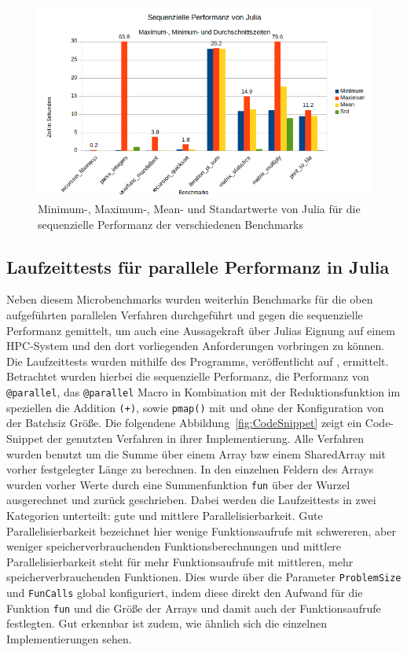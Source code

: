 \documentclass[proseminar,german,utf8]{zihpub}
\begin{document}
\begin{figure}[hbt!]
  \centering
  \includegraphics[scale=0.8]{bilder/julia_performance.png}
  \caption{Minimum-, Maximum-, Mean- und Standartwerte von Julia für die sequenzielle Performanz der verschiedenen Benchmarks }
  \label{fig:juliaPerform}
\end{figure}


\subsection{Laufzeittests für parallele Performanz in Julia}

Neben diesem Microbenchmarks wurden weiterhin Benchmarks für die oben aufgeführten parallelen Verfahren durchgeführt und gegen die sequenzielle Performanz gemittelt, um auch eine Aussagekraft über Julias Eignung auf einem HPC-System und den dort vorliegenden Anforderungen vorbringen zu können. Die Laufzeittests wurden mithilfe des Programms, veröffentlicht auf \cite{JuliaCookbook}, ermittelt. Betrachtet wurden hierbei die sequenzielle Performanz, die Performanz von \verb|@parallel|, das \verb|@parallel| Macro in Kombination mit der Reduktionsfunktion im speziellen die Addition \verb|(+)|, sowie \verb|pmap()| mit und ohne der Konfiguration von der Batchsiz  Größe. Die folgendene Abbildung~\ref{fig:CodeSnippet} zeigt ein Code-Snippet der genutzten Verfahren in ihrer Implementierung. Alle Verfahren wurden benutzt um die Summe über einem Array bzw einem SharedArray mit vorher festgelegter Länge zu berechnen. In den einzelnen Feldern des Arrays wurden vorher Werte durch eine Summenfunktion \verb|fun| über der Wurzel ausgerechnet und zurück geschrieben. Dabei werden die Laufzeittests in zwei Kategorien unterteilt: gute und mittlere Parallelisierbarkeit. Gute Parallelisierbarkeit bezeichnet hier wenige Funktionsaufrufe mit schwereren, aber weniger speicherverbrauchenden Funktionsberechnungen und mittlere Parallelisierbarkeit steht für mehr Funktionsaufrufe mit mittleren, mehr speicherverbrauchenden Funktionen. Dies wurde über die Parameter \verb|ProblemSize| und \verb|FunCalls| global konfiguriert, indem diese direkt den Aufwand für die Funktion \verb|fun| und die Größe der Arrays und damit auch der Funktionsaufrufe festlegten. Gut erkennbar ist zudem, wie ähnlich sich die einzelnen Implementierungen sehen. 
\end{document}
